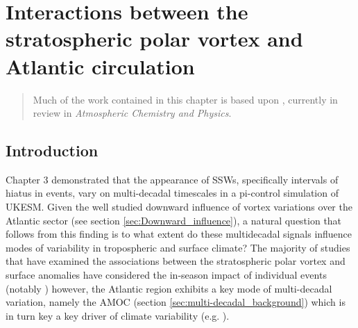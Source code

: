 \chapter{Interactions between the stratospheric polar vortex and Atlantic circulation} 
\begin{quotation}
  Much of the work contained in this chapter is based upon \cite{dimdore-milesInteractions2021},
  currently in review in \emph{Atmospheric Chemistry and Physics}.
\end{quotation}

\label{cha:surface}

\section{Introduction}
Chapter 3 demonstrated that the appearance of SSWs, specifically intervals of hiatus in events, vary on multi-decadal timescales in a pi-control simulation of UKESM. Given the well studied downward influence of vortex variations over the Atlantic sector (see section \ref{sec:Downward_influence}), a natural question that follows from this finding is to what extent do these multidecadal signals influence modes of variability in tropospheric and surface climate? The majority of studies that have examined the associations between the stratospheric polar vortex and surface anomalies have considered the in-season impact of individual events (notably \cite{baldwinStratospheric2001a}) however, the Atlantic region exhibits a key mode of multi-decadal variation, namely the AMOC (section \ref{sec:multi-decadal_background}) which is in turn key a key driver of climate variability (e.g. \cite{frankignoulInfluence2013b}). 

